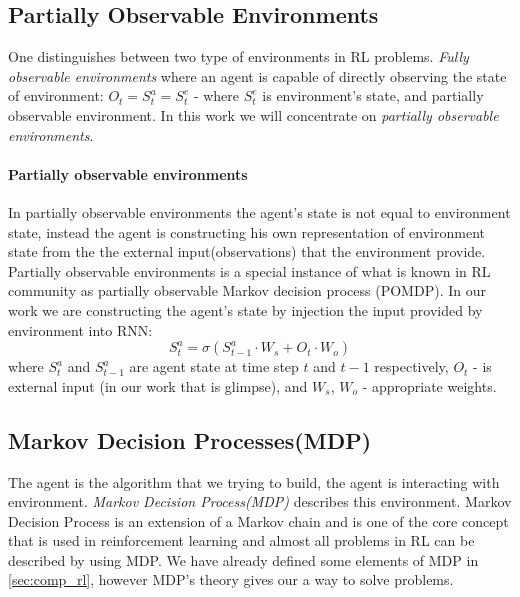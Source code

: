 \subsection{Partially Observable Environments}
One distinguishes between two type of environments in RL problems.
\emph{Fully observable environments} where an agent is capable of directly
observing the state of environment:
$O_t = S_t^a = S_t^e$ - where $S_t^e$ is environment's state,
and partially observable environment. In this work we will concentrate
on \emph{partially observable environments}.

\paragraph{Partially observable environments}
In partially observable environments the agent's state is not equal to environment state,
instead the agent is constructing his own representation of environment state from
the the external input(observations) that the environment provide.
Partially observable environments is a special instance of what is known in RL community
as partially observable Markov decision process (POMDP). In our work we are constructing
the agent's state by injection the input provided by environment into RNN:
\begin{equation} \label{eq:rnn_state}
	S_t^a = \sigma(S_{t-1}^a \cdot W_s + O_t \cdot W_o)
\end{equation}
where $S_t^a$ and $S_{t-1}^a$ are agent state at time step $t$ and $t-1$
respectively, $O_t$ - is external input (in our work that is glimpse),
and $W_s$, $W_o$ - appropriate weights.



\subsection{Markov Decision Processes(MDP)} \label{subs:reward_process}
The agent is the algorithm that we trying to build, the agent is interacting with
environment. \emph{Markov Decision Process(MDP)} describes this environment.
Markov Decision Process is an extension of a Markov chain and is one of the core
concept that is used in reinforcement learning and almost all problems in RL
can be described by using MDP. We have already defined some elements of MDP in \autoref{sec:comp_rl},
however MDP's theory gives our a way to solve problems.

